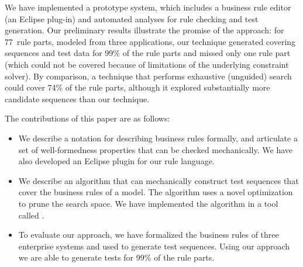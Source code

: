 We have implemented a prototype system, which includes a business rule editor
(an Eclipse plug-in) and automated analyses for rule checking and test
generation. Our preliminary results illustrate the promise of the approach: for
77~rule parts, modeled from three applications, our technique generated covering
sequences and test data for 99\% of the rule parts and missed only one rule part
(which could not be covered because of limitations of the underlying constraint
solver). By comparison, a technique that performs exhaustive (unguided) search
could cover 74\% of the rule parts, although it explored substantially more
candidate sequences than our technique.

The contributions of this paper are as follows:
\begin{itemize}[noitemsep]
\item We describe a notation for describing business rules formally, and articulate
  a set of well-formedness properties that can be checked mechanically. We have 
  also developed an Eclipse plugin for our rule language.
\item We describe an algorithm that can mechanically construct test sequences
  that cover the business rules of a model. The algorithm uses a
  novel optimization to prune the search space. We have implemented
  the algorithm in a tool called \tool{}.
\item To evaluate our approach, we have formalized the business rules
  of three enterprise systems and used \tool{} to generate test
  sequences. Using our approach we are able to generate tests for 99\%
  of the rule parts.
\end{itemize}

